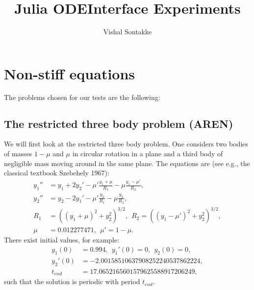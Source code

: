 \documentclass[notitlepage,12pt]{article}
\title{\textbf{Julia ODEInterface Experiments}}
\author{Vishal Sontakke}
\date{}
\begin{document}
\maketitle
\tableofcontents
\newpage
\section{Non-stiff equations}
The problems chosen for our tests are the following:
\subsection{The restricted three body problem (AREN)}
\label{sec:Aren}
We will first look at the restricted three body problem. One considers two bodies of masses $1 - \mu$ and $\mu$ in circular rotation in a plane and a third body of negligible mass moving around in the same plane. The equations are (see e.g., the classical textbook Szebehely 1967):
\begin{equation}
\label{eq:threeBody}
\begin{aligned}
	y_1'' &= y_1 + 2y_2' - \mu'\frac{y_1+\mu}{R_1} -\mu \frac{y_1-\mu'}{R_2},\\
	y_2'' &= y_2 - 2y_1' -\mu' \frac{y_2}{R_1} -\mu \frac{y_2}{R_2},\\
	R_1 &= \left(\left(y_1+\mu\right)^2 + y_2^2\right)^{3/2},
	\ \ R_2 = \left(\left(y_1-\mu'\right)^2 + y_2^2\right)^{3/2},\\
	\mu &= 0.012277471, \ \ \mu' = 1 -\mu .
\end{aligned}
\end{equation}
There exist initial values, for example:
\begin{equation}
\label{eq:3bodyIV}
\begin{aligned}
y_1(0) &= 0.994, \ \ y_1'(0) = 0, \ \ y_2(0) = 0,\\
y_2'(0) &= −2.00158510637908252240537862224,\\
t_{end} &= 17.0652165601579625588917206249,
\end{aligned}
\end{equation}
such that the solution is periodic with period $t_{end}$.
\end{document}
